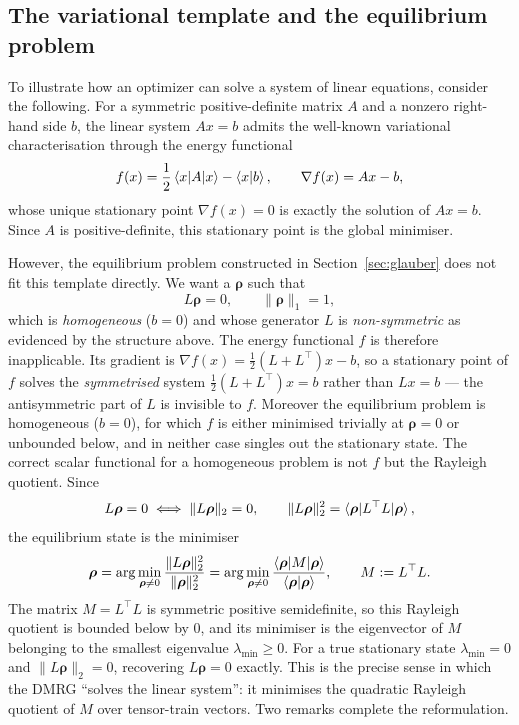 \documentclass[12pt]{article}
\newcommand{\brho}{\boldsymbol{\rho}}
\theoremstyle{definition}
\theoremstyle{remark}
\begin{document}
\subsection{The variational template and the equilibrium problem}\label{sec:variational}

To illustrate how an optimizer can solve a system of linear equations, consider the following. For a symmetric positive-definite matrix $A$ and a nonzero right-hand side $b$, the linear system $Ax = b$ admits the well-known variational characterisation through the energy functional
\[
f(x) = \frac{1}{2}\braket{x|A|x} - \braket{x|b}, \qquad \nabla f(x) = Ax - b,
\]
whose unique stationary point $\nabla f(x) = 0$ is exactly the solution of $Ax = b$. Since $A$ is positive-definite, this stationary point is the global minimiser.


However, the equilibrium problem constructed in Section~\ref{sec:glauber} does not fit this template directly. We want a $\brho$ such that 
\[
L\brho = 0, \qquad \|\brho\|_1 = 1,
\]
which is \emph{homogeneous} ($b = 0$) and whose generator $L$ is \emph{non-symmetric} as evidenced by the structure above. The energy functional $f$ is therefore inapplicable. Its gradient is $\nabla f(x) = \tfrac{1}{2}(L + L^\top)x - b$, so a stationary point of $f$ solves the \emph{symmetrised} system $\tfrac{1}{2}(L + L^\top)x = b$ rather than $Lx = b$ --- the antisymmetric part of $L$ is invisible to $f$. Moreover the equilibrium problem is homogeneous ($b = 0$), for which $f$ is either minimised trivially at $\brho = 0$ or unbounded below, and in neither case singles out the stationary state. The correct scalar functional for a homogeneous problem is not $f$ but the Rayleigh quotient. Since
\[
L\brho = 0 \iff \|L\brho\|_2 = 0, \qquad \|L\brho\|_2^2 = \braket{\brho | L^\top L | \brho},
\]
the equilibrium state is the minimiser
\[
\brho = \arg\min_{\brho \neq 0} \frac{\|L\brho\|_2^2}{\|\brho\|_2^2}
      = \arg\min_{\brho \neq 0} \frac{\braket{\brho | M | \brho}}{\braket{\brho | \brho}},
      \qquad M := L^\top L.
\]
The matrix $M = L^\top L$ is symmetric positive semidefinite, so this Rayleigh quotient is bounded below by $0$, and its minimiser is the eigenvector of $M$ belonging to the smallest eigenvalue $\lambda_{\min} \geq 0$. For a true stationary state $\lambda_{\min} = 0$ and $\|L\brho\|_2 = 0$, recovering $L\brho = 0$ exactly. This is the precise sense in which the DMRG ``solves the linear system'': it minimises the quadratic Rayleigh quotient of $M$ over tensor-train vectors. Two remarks complete the reformulation.
\end{document}
